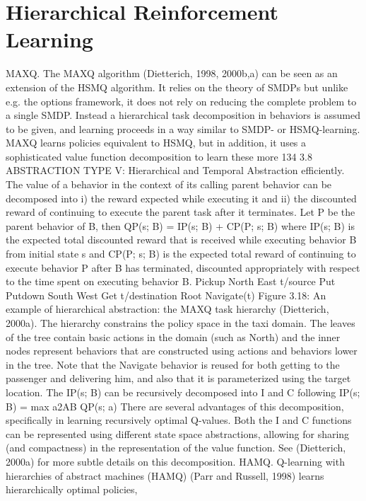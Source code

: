 \section{Hierarchical Reinforcement Learning}
MAXQ. The MAXQ algorithm (Dietterich, 1998, 2000b,a) can be seen as an extension
of the HSMQ algorithm. It relies on the theory of SMDPs but unlike e.g. the options
framework, it does not rely on reducing the complete problem to a single SMDP. Instead a
hierarchical task decomposition in behaviors is assumed to be given, and learning proceeds
in a way similar to SMDP- or HSMQ-learning. MAXQ learns policies equivalent to HSMQ,
but in addition, it uses a sophisticated value function decomposition to learn these more
134
3.8 ABSTRACTION TYPE V: Hierarchical and Temporal Abstraction
efficiently. The value of a behavior in the context of its calling parent behavior can be
decomposed into i) the reward expected while executing it and ii) the discounted reward
of continuing to execute the parent task after it terminates. Let P be the parent behavior
of B, then
QP(s; B) = IP(s; B) + CP(P; s; B)
where IP(s; B) is the expected total discounted reward that is received while executing
behavior B from initial state s and CP(P; s; B) is the expected total reward of continuing to
execute behavior P after B has terminated, discounted appropriately with respect to the
time spent on executing behavior B.
Pickup
North East
t/source
Put
Putdown
South West
Get
t/destination
Root
Navigate(t)
Figure 3.18: An example of hierarchical abstraction:
the MAXQ task hierarchy (Dietterich,
2000a). The hierarchy constrains the policy space
in the taxi domain. The leaves of the tree contain
basic actions in the domain (such as North) and
the inner nodes represent behaviors that are constructed
using actions and behaviors lower in the
tree. Note that the Navigate behavior is reused
for both getting to the passenger and delivering
him, and also that it is parameterized using the
target location.
The IP(s; B) can be recursively decomposed
into I and C following
IP(s; B) = max
a2AB
QP(s; a)
There are several advantages of this decomposition,
specifically in learning recursively
optimal Q-values. Both the I and C functions
can be represented using different state
space abstractions, allowing for sharing (and
compactness) in the representation of the
value function. See (Dietterich, 2000a) for
more subtle details on this decomposition.
HAMQ. Q-learning with hierarchies of abstract
machines (HAMQ) (Parr and Russell,
1998) learns hierarchically optimal policies,

